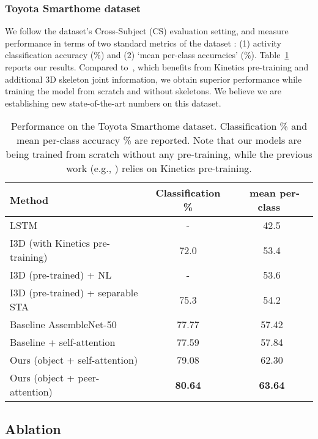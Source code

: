 \documentclass[runningheads]{llncs}
\begin{document}
\subsubsection{Toyota Smarthome dataset}
\label{sec:results-toyota}

We follow the dataset's Cross-Subject (CS) evaluation setting, and measure performance in terms of two standard metrics of the dataset \cite{das2019toyota}: (1) activity classification accuracy (\%) and (2) `mean per-class accuracies' (\%). Table~\ref{tab:toyota} reports our results. Compared to~\cite{das2019toyota}, which benefits from Kinetics pre-training and additional 3D skeleton joint information, we obtain superior performance while training the model from scratch and without skeletons. We believe we are establishing new state-of-the-art numbers on this dataset.


\begin{table}[t]
\caption{Performance on the Toyota Smarthome dataset. Classification \% and mean per-class accuracy \% are reported. Note that our models are being trained from scratch without any pre-training, while the previous work (e.g., \cite{das2019toyota}) relies on Kinetics pre-training.}
\label{tab:toyota}
\begin{center}
\begin{tabular}{|l|c|c|}
\hline
Method &  Classification \% & ~mean per-class~ \\            
\hline
LSTM \cite{mahasseni2016lstm} & - & 42.5 \\
I3D (with Kinetics pre-training) & 72.0 & 53.4 \\
I3D (pre-trained) + NL \cite{wang2018non} & - & 53.6 \\
I3D (pre-trained) + separable STA \cite{das2019toyota} & 75.3 & 54.2 \\
\hline
Baseline AssembleNet-50  & 77.77 & 57.42  \\
Baseline + self-attention & 77.59 & 57.84 \\
\hline
Ours (object + self-attention) & 79.08 & 62.30 \\
Ours (object + peer-attention) & \textbf{80.64} &\textbf{63.64} \\
\hline
\end{tabular}
\end{center}
\end{table}


\subsection{Ablation}
\label{subsec:exp-abl}
\end{document}

